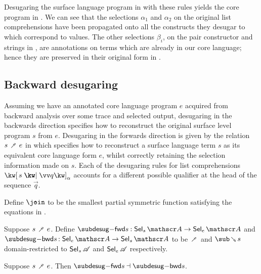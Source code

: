 \noindent
Desugaring the surface language program in  with these rules yields the core program in . We can see that the selections $\alpha_1$ and $\alpha_2$ on the original list comprehensions have been propagated onto all the constructs they desugar to which correspond to values. The other selections $\beta_i$, on the pair constructor and strings in , are annotations on terms which are already in our core language; hence they are preserved in their original form in .

\subsection{Backward desugaring}

Assuming we have an annotated core language program $e$ acquired from backward analysis over some trace and selected output, desugaring in the backwards direction specifies how to reconstruct the original surface level program $s$ from $e$.
Desugaring in the forwards direction is given by the relation $s \desugarFwdR e$ in  which specifies how to reconstruct a surface language term $s$ as its equivalent core language form $e$, whilst correctly retaining the selection information made on $s$. Each of the desugaring rules for list comprehensions $\annListComp{s}{\vec{q}}{\alpha}$ accounts for a different possible qualifier at the head of the sequence $\vec{q}$.


\begin{definition}
   Define $\disjjoin$ to be the smallest partial symmetric function satisfying the equations in .
\end{definition}

\begin{definition}
     Suppose $s \desugarFwdR e$. Define $\desugarFwdF{s}: \Below{s} \to \Below{e}$ and $\desugarBwdF{s}: \Below{e} \to \Below{s}$ to be $\desugarFwdR$ and $\desugarBwdR{s}$ domain-restricted to $\textup{\textsf{Sel}}_{s}\,{\mathscr{A}}$ and $\textup{\textsf{Sel}}_{e}\,{\mathscr{A}}$ respectively.
\end{definition}

\begin{theorem}
  \label{thm:surface-language:desugar:gc}
     Suppose $s \desugarFwdR e$. Then $\desugarFwdF{s} \adjoint \desugarBwdF{s}$.
\end{theorem}

